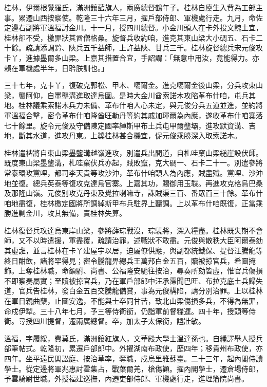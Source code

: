 \begin{pinyinscope}
桂林，伊爾根覺羅氏，滿洲鑲藍旗人，兩廣總督鶴年子。桂林自廩生入貲為工部主事。累遷山西按察使。乾隆三十六年三月，擢戶部侍郎、軍機處行走。九月，命佐定邊右副將軍溫福討金川。十一月，授四川總督。小金川頭人在卡外投文餽土宜，桂林卻不受，檄罪狀其酋僧格桑。旋督兵收約咱，進克其東山梁大小碉五、石卡二十餘。疏請添調黔、陜兵五千益師，上許益陜、甘兵三千。桂林旋督總兵宋元俊攻卡丫，進據墨爾多山梁。上嘉其措置合宜，手詔謂：「無意中用汝，竟能得力。亦賴在軍機處半年，日耹朕訓也。」

三十七年，克卡丫，復破克郭松、甲木、噶爾金。進克噶爾金後山梁，分兵攻東山梁，襲阿仰，自墨壟溝進取達烏圍。是時大金川酋索諾木攻陷革布什咱，屯兵其地。桂林議乘索諾木兵力未備、革布什咱人心未定，與元俊分兵五道並進，並約將軍溫福合擊，密令革布什咱降酋旺勒丹等約其戚加琿爾為內應，遂收革布什咱寨落七十餘里。旋令元俊及守備陳定國率綽斯甲布土兵屯甲爾壟壩，進攻默資溝、吉地，斷其水道，進攻丹東。上獎桂林甚合機宜，促元俊乘勝深入取索諾木。

桂林遣裨將自東山梁墨壟溝越嶺進攻，別遣兵出間道，自札哇窠山梁縋崖設伏師。既度東山梁墨壟溝，札哇窠伏兵亦起，賊敗竄，克大碉一、石卡二十一。別遣參將常泰環攻黨哩，都司李天貴等攻沙沖，革布什咱頭人為內應，賊盡殲。黨哩、沙沖地並復。總兵英泰等復攻克達烏官寨。上嘉其功，賜御用玉韘。再進攻克格烏巴桑及那隆山嶺。元俊別攻克丹東及覺拉喇嘛寺，誅賊渠三百、番眾百三十餘。革布什咱地盡復，桂林檄定國將所調綽斯甲布兵駐界上聽調。上以革布什咱既復，正當乘勝進剿金川，攻其無備，責桂林失算。

桂林復督兵攻達烏東岸山梁，參將薛琮戰沒，琮驍將，深入糧盡。桂林既失期不會師，又不以時遣援，軍盡覆，疏請治罪，述戰狀不敢盡。元俊與散秩大臣阿爾泰劾其虛誑，並言桂林在卡丫建屋宇以居，迫屬僚供應，與副都統鐵保、提督汪騰龍等終日酣飲，諸將罕得見；密令騰龍畀總兵王萬邦白金五百，贖被掠官兵，希圖掩飾。上奪桂林職，命額駙、尚書、公福隆安馳往按治，尋奏所劾皆虛，惟官兵傷損不即察奏屬實；至贖被掠官兵，乃在軍戶部郎中汪承霈聞巴旺、布拉克底土兵歸失道，官兵告桂林，發白金五百交騰龍備賞，事為元俊構陷，請分別治罪。上以桂林在軍日親曲糵，止圖安逸，不能與士卒同甘苦，致北山梁傷損多兵，不得為無罪，命戍伊犁。三十八年七月，予三等侍衛銜，仍詣軍前督糧運。四十年，授頭等侍衛。尋授四川提督，遷兩廣總督。卒，加太子太保銜，謚壯敏。

溫福，字履綏，費莫氏，滿洲鑲紅旗人，文華殿大學士溫達孫也。自繙譯舉人授兵部筆帖式。乾隆初，累遷戶部郎中。外擢湖南布政使，歷四年；移貴州布政使，亦四年。坐平遠民閧訟庭、按治草率，奪職，戍烏里雅蘇臺。二十三年，起內閣侍讀學士。從定邊將軍兆惠討霍集占，戰葉爾羌，槍傷顴。擢內閣學士，遷倉場侍郎，予雲騎尉世職。外授福建巡撫，內遷吏部侍郎、軍機處行走，進理籓院尚書。


\end{pinyinscope}
